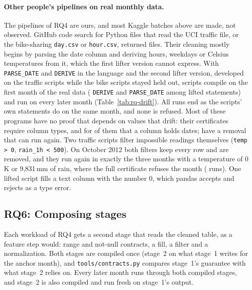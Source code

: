 \paragraph{Other people's pipelines on real monthly data.} The pipelines of RQ4 are ours, and most
Kaggle batches above are made, not observed. GitHub code search for Python files that read the UCI
traffic file, or the bike-sharing \texttt{day.csv} or \texttt{hour.csv}, returned \DriftAll{} files.
Their cleaning mostly begins by parsing the date column and deriving hours, weekdays or Celsius
temperatures from it, which the first lifter version cannot express. With \texttt{PARSE\_DATE} and
\texttt{DERIVE} in the language and the second lifter version, developed on the traffic scripts while
the bike scripts stayed held out, \DriftCompiled{} scripts compile on the first month of the real data
(\DriftDerive{} \texttt{DERIVE} and \DriftParseDate{} \texttt{PARSE\_DATE} among \DriftStatements{}
lifted statements) and run on every later month (Table~\ref{tab:rq-drift}). All \DriftRuns{} runs end
as the scripts' own statements do on the same month, and none is refused. Most of these programs have
no proof that depends on values that drift: their certificates require column types, and for
\DriftDatesAdmitted{} of them that a column holds dates; \DriftWithRemovals{} have a removal that can run
again. Two traffic scripts filter impossible readings themselves (\texttt{temp > 0},
\texttt{rain\_1h < 500}). On October 2012 both filters keep every row and are removed, and they run
again in exactly the three months with a temperature of 0\,K or 9,831\,mm of rain, where the full
certificate refuses the month (\DriftTrafficFullNeedless{} runs). One lifted script fills a text column
with the number 0, which pandas accepts and \PL rejects as a type error.

\subsection{RQ6: Composing stages}\label{sec:rq-compose}

Each workload of RQ4 gets a second stage that reads the cleaned table, as a feature step would: range
and not-null contracts, a fill, a filter and a normalization. Both stages are compiled once (stage~2 on
what stage~1 writes for the anchor month), and \texttt{tools/contracts.py} compares stage~1's guarantee
with what stage~2 relies on. Every later month runs through both compiled stages, and stage~2 is also
compiled and run fresh on stage~1's output.

